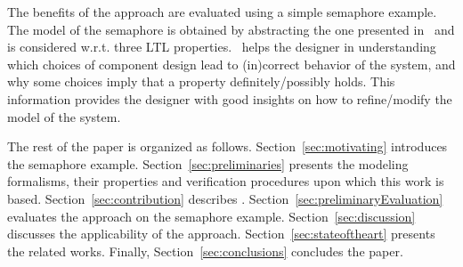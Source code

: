 The benefits of the approach are evaluated using a simple semaphore example.
The model of the semaphore is obtained by abstracting the one presented in~\cite{katoen2008} and is considered w.r.t. three LTL properties.
\NAME\ helps the designer in understanding which choices of component design lead to (in)correct behavior of the system, and why some choices imply that a property definitely/possibly holds.
This information provides the designer with good insights on how to refine/modify the model of the system.

\begin{sloppypar}
The rest of the paper is organized as follows. 
Section~\ref{sec:motivating} introduces the semaphore example.
Section~\ref{sec:preliminaries} presents the modeling formalisms, their properties and verification procedures upon which this work is based.
Section~\ref{sec:contribution} describes \NAME.
Section~\ref{sec:preliminaryEvaluation} evaluates the approach on the semaphore example.
Section~\ref{sec:discussion} discusses the applicability of the approach.
Section~\ref{sec:stateoftheart}  presents the related works.
Finally, Section~\ref{sec:conclusions} concludes the paper.
\end{sloppypar}

